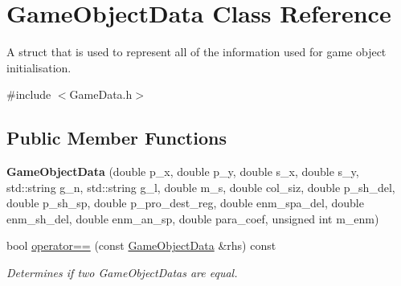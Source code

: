 \hypertarget{struct_game_object_data}{}\section{Game\+Object\+Data Class Reference}
\label{struct_game_object_data}


A struct that is used to represent all of the information used for game object initialisation.  




{\ttfamily \#include $<$Game\+Data.\+h$>$}

\subsection*{Public Member Functions}
\begin{DoxyCompactItemize}
\item 
\mbox{\label{struct_game_object_data_a0baf6abe71f79dc7d7efdf9848b82718}} 
{\bfseries Game\+Object\+Data} (double p\+\_\+x, double p\+\_\+y, double s\+\_\+x, double s\+\_\+y, std\+::string g\+\_\+n, std\+::string g\+\_\+l, double m\+\_\+s, double col\+\_\+siz, double p\+\_\+sh\+\_\+del, double p\+\_\+sh\+\_\+sp, double p\+\_\+pro\+\_\+dest\+\_\+reg, double enm\+\_\+spa\+\_\+del, double enm\+\_\+sh\+\_\+del, double enm\+\_\+an\+\_\+sp, double para\+\_\+coef, unsigned int m\+\_\+enm)
\item 
\mbox{\label{struct_game_object_data_a6dfcd617b8aeb50e4a3944b58cf5590e}} 
bool \hyperlink{struct_game_object_data_a6dfcd617b8aeb50e4a3944b58cf5590e}{operator==} (const \hyperlink{struct_game_object_data}{Game\+Object\+Data} \&rhs) const
\begin{DoxyCompactList}\small\item\em Determines if two Game\+Object\+Datas are equal. \end{DoxyCompactList}\end{DoxyCompactItemize}
